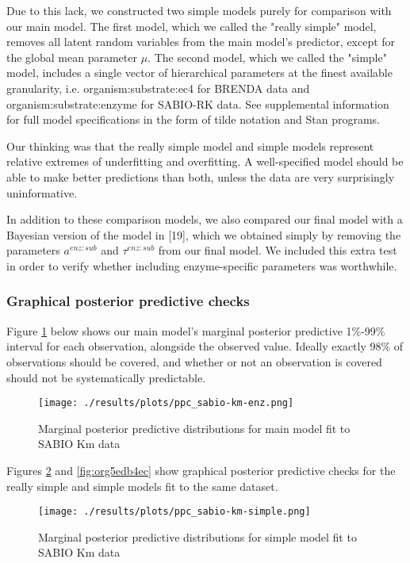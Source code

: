 \documentclass[11pt]{article}
\makeatletter
\newcommand{\citeprocitem}[2]{\hyper@linkstart{cite}{citeproc_bib_item_#1}#2\hyper@linkend}
\makeatother
\begin{document}
Due to this lack, we constructed two simple models purely for comparison with
our main model. The first model, which we called the "really simple" model,
removes all latent random variables from the main model's predictor, except for
the global mean parameter \(\mu\). The second model, which we called the "simple"
model, includes a single vector of hierarchical parameters at the finest
available granularity, i.e. organism:substrate:ec4 for BRENDA data and
organism:substrate:enzyme for SABIO-RK data. See supplemental information for
full model specifications in the form of tilde notation and Stan programs.

Our thinking was that the really simple model and simple models represent
relative extremes of underfitting and overfitting. A well-specified model should
be able to make better predictions than both, unless the data are very
surprisingly uninformative.

In addition to these comparison models, we also compared our final model with a
Bayesian version of the model in \citeprocitem{19}{[19]},
which we obtained simply by removing the parameters \(a^{enz:sub}\) and
\(\tau^{enz:sub}\) from our final model. We included this extra test in order to
verify whether including enzyme-specific parameters was worthwhile.

\subsubsection{Graphical posterior predictive checks}
\label{sec:org9b775a6}
Figure \ref{fig:orga252fa7} below shows our main model's marginal posterior
predictive 1\%-99\% interval for each observation, alongside the observed
value. Ideally exactly 98\% of observations should be covered, and whether or not
an observation is covered should not be systematically predictable.

\begin{figure}[htbp]
\centering
\texttt{[image: ./results/plots/ppc\_sabio-km-enz.png]}
\caption{\label{fig:orga252fa7}Marginal posterior predictive distributions for main model fit to SABIO Km data}
\end{figure}

Figures \ref{fig:org976ad80} and \ref{fig:org5edb4ec} show
graphical posterior predictive checks for the really simple and simple models
fit to the same dataset.

\begin{figure}[htbp]
\centering
\texttt{[image: ./results/plots/ppc\_sabio-km-simple.png]}
\caption{\label{fig:org976ad80}Marginal posterior predictive distributions for simple model fit to SABIO Km data}
\end{figure}
\end{document}
